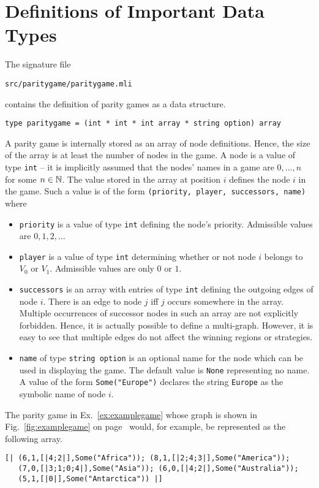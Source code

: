 \section{Definitions of Important Data Types}

The signature file
\begin{verbatim}
src/paritygame/paritygame.mli
\end{verbatim}
contains the definition of parity games as a data structure.
\begin{verbatim}
type paritygame = (int * int * int array * string option) array
\end{verbatim}
A parity game is internally stored as an array of node definitions. Hence, the size of the array
is at least the number of nodes in the game. A node is a value of type \texttt{int} -- it is
implicitly assumed that the nodes' names in a game are $0,\ldots,n$ for some $n \in \mathbb{N}$. The
value stored in the array at position $i$ defines the node $i$ in the game. Such a value is of
the form \verb#(priority, player, successors, name)# where
\begin{itemize}
\item \texttt{priority} is a value of type \texttt{int} defining the node's priority. Admissible
      values are $0,1,2,\ldots$
\item \texttt{player} is a value of type \texttt{int} determining whether or not node $i$ belongs
      to $V_0$ or $V_1$. Admissible values are only $0$ or $1$.
\item \texttt{successors} is an array with entries of type \texttt{int} defining the outgoing edges
      of node $i$. There is an edge to node $j$ iff $j$ occurs somewhere in the array. Multiple
      occurrences of successor nodes in such an array are not explicitly forbidden. Hence, it is
      actually possible to define a multi-graph. However, it is easy to see that
      multiple edges do not affect the winning regions or strategies.
\item \texttt{name} of type \texttt{string option} is an optional name for the node which can be
      used in displaying the game. The default value is \texttt{None} representing no name. A value
      of the form \verb#Some("Europe")# declares the string \texttt{Europe} as the symbolic name of
      node $i$.
\end{itemize}

\begin{example}
The parity game in Ex.~\ref{ex:examplegame} whose graph is shown in Fig.~\ref{fig:examplegame} on
page~\pageref{fig:examplegame} would, for example, be represented as the following array.
\begin{verbatim}
[| (6,1,[|4;2|],Some("Africa")); (8,1,[|2;4;3|],Some("America"));
   (7,0,[|3;1;0;4|],Some("Asia")); (6,0,[|4;2|],Some("Australia"));
   (5,1,[|0|],Some("Antarctica")) |]
\end{verbatim}
\end{example}

